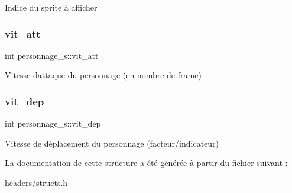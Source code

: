 Indice du sprite à afficher \mbox{\label{structpersonnage__s_a0022973bab638a02774a19710cedcd17}} 
\subsubsection{\texorpdfstring{vit\+\_\+att}{vit\_att}}
{\footnotesize\ttfamily int personnage\+\_\+s\+::vit\+\_\+att}

Vitesse d\textquotesingle{}attaque du personnage (en nombre de frame) \mbox{\label{structpersonnage__s_a6899a0efdc3a3fccb060aaf06b4e4b8d}} 
\subsubsection{\texorpdfstring{vit\+\_\+dep}{vit\_dep}}
{\footnotesize\ttfamily int personnage\+\_\+s\+::vit\+\_\+dep}

Vitesse de déplacement du personnage (facteur/indicateur) 

La documentation de cette structure a été générée à partir du fichier suivant \+:\begin{DoxyCompactItemize}
\item 
headers/\hyperlink{structs_8h}{structs.\+h}\end{DoxyCompactItemize}

